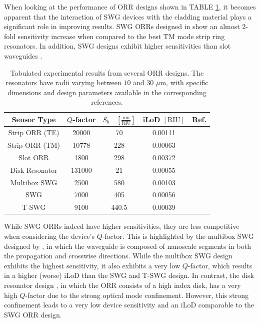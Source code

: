 \documentclass[aps,prl,twocolumn, superscriptaddress,nobalancelastpage]{revtex4}
\begin{document}

When looking at the performance of ORR designs shown in TABLE \ref{tab1}, it becomes apparent that the interaction of SWG devices with the cladding material plays a significant role in improving results. SWG ORRs designed in \cite{swg3} show an almost 2-fold sensitivity increase when compared to the best TM mode strip ring resonators. In addition, SWG designs \cite{swg3, TSWGbio, MultiboxSensor} exhibit higher sensitivities than slot waveguides \cite{SlotBiosensor}.
\pagebreak
\begin{table}[!h]
\centering
\begin{tabular}{|c|c|c|c|c|}
\hline
\textbf{Sensor Type} & \textbf{$Q$-factor} & \textbf{$S_b \quad \left[\frac{\text{nm}}{\text{RIU}}\right] $} & \textbf{iLoD $\left[\text{RIU}\right]$} & \textbf{Ref.} \\ \hline
Strip ORR (TE) & 20000 & 70 & 0.00111 & \cite{TEsensor} \\ \hline
Strip ORR (TM) & 10778 & 228 & 0.00063 & \cite{StripBiosensor} \\ \hline
Slot ORR & 1800 & 298 & 0.00372 & \cite{SlotBiosensor} \\ \hline
Disk Resonator & 131000 & 21 & 0.00055 & \cite{DiskSensor} \\ \hline
Multibox SWG & 2500 & 580 & 0.00103 & \cite{MultiboxSensor} \\ \hline
SWG & 7000 & 405 & 0.00056 & \cite{swg3} \\ \hline
T-SWG & 9100 & 440.5 & 0.00039 & \cite{TSWGbio} \\ \hline
\end{tabular}
\caption{Tabulated experimental results from several ORR designs. The resonators have radii varying between $10$ and $30$ $\mu$m, with specific dimensions and design parameters available in the corresponding references.}
\label{tab1}
\end{table}

While SWG ORRs indeed have higher sensitivities, they are less competitive when considering the device's $Q$-factor. This is highlighted by the multibox SWG designed by \cite{MultiboxSensor}, in which the waveguide is composed of nanoscale segments in both the propagation and crosswise directions. While the multibox SWG design exhibits the highest sensitivity, it also exhibits a very low $Q$-factor, which results in a higher (worse) iLoD than the SWG and T-SWG design. In contrast, the disk resonator design \cite{DiskSensor}, in which the ORR consists of a high index disk, has a very high $Q$-factor due to the strong optical mode confinement. However, this strong confinement leads to a very low device sensitivity and an iLoD comparable to the SWG ORR design. 
\end{document}
